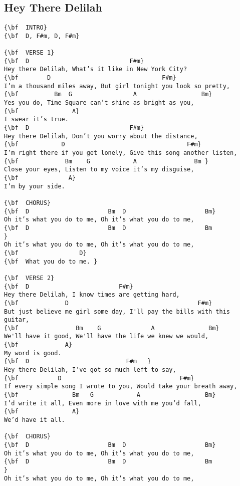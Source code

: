 \documentclass[a4paper]{article}
\begin{document}
\subsection{Hey There Delilah}
\begin{Verbatim}[commandchars=\\\{\}]
{\bf  INTRO}
{\bf  D, F#m, D, F#m}

{\bf  VERSE 1}
{\bf  D                            F#m}
Hey there Delilah, What’s it like in New York City? 
{\bf        D                               F#m}
I’m a thousand miles away, But girl tonight you look so pretty, 
{\bf          Bm  G                 A                  Bm}
Yes you do, Time Square can’t shine as bright as you, 
{\bf               A}
I swear it’s true. 
{\bf  D                            F#m}
Hey there Delilah, Don’t you worry about the distance, 
{\bf            D                                  F#m}
I’m right there if you get lonely, Give this song another listen, 
{\bf             Bm    G            A                Bm }
Close your eyes, Listen to my voice it’s my disguise, 
{\bf              A}
I’m by your side. 

{\bf  CHORUS}
{\bf  D                      Bm  D                      Bm}
Oh it’s what you do to me, Oh it’s what you do to me, 
{\bf  D                      Bm  D                      Bm            }
Oh it’s what you do to me, Oh it’s what you do to me, 
{\bf                 D}
{\bf  What you do to me. }

{\bf  VERSE 2}
{\bf  D                         F#m}
Hey there Delilah, I know times are getting hard, 
{\bf             D                                    F#m}
But just believe me girl some day, I'll pay the bills with this guitar, 
{\bf                Bm    G              A               Bm}
We'll have it good, We'll have the life we knew we would, 
{\bf             A}
My word is good. 
{\bf  D                           F#m   }
Hey there Delilah, I’ve got so much left to say, 
{\bf           D                                 F#m}
If every simple song I wrote to you, Would take your breath away, 
{\bf               Bm   G            A                  Bm}
I’d write it all, Even more in love with me you’d fall, 
{\bf               A}
We’d have it all. 

{\bf  CHORUS}
{\bf  D                      Bm  D                      Bm}
Oh it’s what you do to me, Oh it’s what you do to me, 
{\bf  D                      Bm  D                      Bm            }
Oh it’s what you do to me, Oh it’s what you do to me, 


\end{Verbatim}
\end{document}
